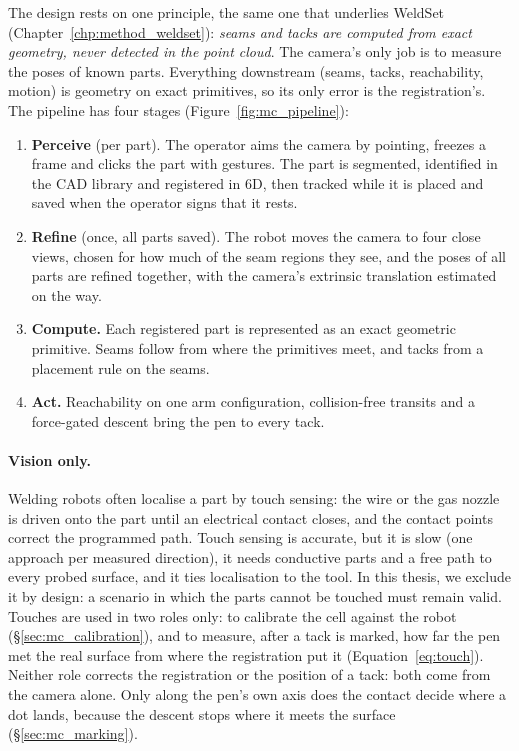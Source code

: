 The design rests on one principle, the same one that underlies WeldSet
(Chapter~\ref{chp:method_weldset}): \emph{seams and tacks are computed from exact geometry,
never detected in the point cloud}. The camera's only job is to measure the poses of known
parts. Everything downstream (seams, tacks, reachability, motion) is geometry on exact
primitives, so its only error is the registration's. The pipeline has four stages
(Figure~\ref{fig:mc_pipeline}):
\begin{enumerate}
\item \textbf{Perceive} (per part). The operator aims the camera by pointing, freezes a frame
  and clicks the part with gestures. The part is segmented, identified in the CAD library and
  registered in 6D, then tracked while it is placed and saved when the operator signs that it
  rests.
\item \textbf{Refine} (once, all parts saved). The robot moves the camera to four close views,
  chosen for how much of the seam regions they see, and the poses of all parts are refined
  together, with the camera's extrinsic translation estimated on the way.
\item \textbf{Compute.} Each registered part is represented as an exact geometric primitive.
  Seams follow from where the primitives meet, and tacks from a placement rule on the seams.
\item \textbf{Act.} Reachability on one arm configuration, collision-free transits and a
  force-gated descent bring the pen to every tack.
\end{enumerate}

\paragraph{Vision only.} Welding robots often localise a part by touch sensing: the wire or
the gas nozzle is driven onto the part until an electrical contact closes, and the contact
points correct the programmed path. Touch sensing is accurate, but it is slow (one approach per
measured direction), it needs conductive parts and a free path to every probed surface, and it
ties localisation to the tool. In this thesis, we exclude it by design: a scenario in which the
parts cannot be touched must remain valid. Touches are used in two roles only: to calibrate the
cell against the robot (\S\ref{sec:mc_calibration}), and to measure, after a tack is marked,
how far the pen met the real surface from where the registration put it
(Equation~\ref{eq:touch}). Neither role corrects the registration or the position of a tack:
both come from the camera alone. Only along the pen's own axis does the contact decide where a dot
lands, because the descent stops where it meets the surface (\S\ref{sec:mc_marking}).

